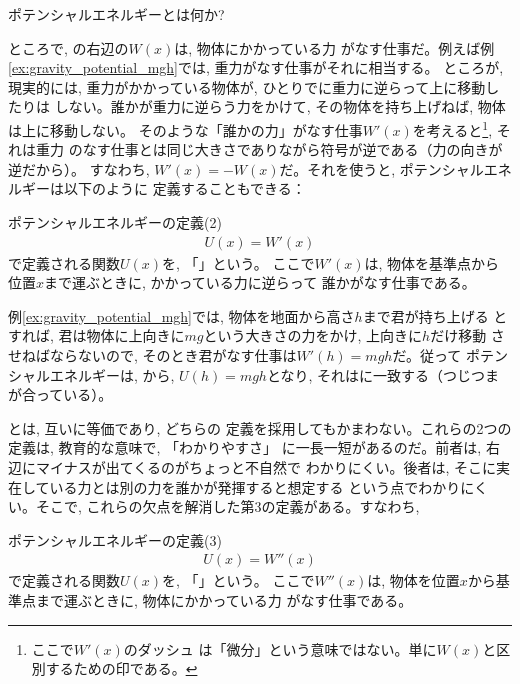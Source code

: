 %
\begin{q}\label{q:def_potential}
ポテンシャルエネルギーとは何か? 
\end{q}

ところで, の右辺の$W(x)$は, 物体にかかっている力
がなす仕事だ。例えば例\ref{ex:gravity_potential_mgh}では, 重力がなす仕事がそれに相当する。
ところが, 現実的には, 重力がかかっている物体が, ひとりでに重力に逆らって上に移動したりは
しない。誰かが重力に逆らう力をかけて, その物体を持ち上げねば, 物体は上に移動しない。
そのような「誰かの力」がなす仕事$W'(x)$を考えると\footnote{ここで$W'(x)$のダッシュ
は「微分」という意味ではない。単に$W(x)$と区別するための印である。}, それは重力
のなす仕事とは同じ大きさでありながら符号が逆である（力の向きが逆だから）。
すなわち, $W'(x)=-W(x)$だ。それを使うと, ポテンシャルエネルギーは以下のように
定義することもできる：

\begin{itembox}{ポテンシャルエネルギーの定義(2)}
\begin{eqnarray}
U(x)=W'(x)\label{eq:potential2}
\end{eqnarray}
で定義される関数$U(x)$を, 「」という。
ここで$W'(x)$は, 物体を基準点から位置$x$まで運ぶときに, かかっている力に逆らって
誰かがなす仕事である。
\end{itembox}

例\ref{ex:gravity_potential_mgh}では, 物体を地面から高さ$h$まで君が持ち上げる
とすれば, 君は物体に上向きに$mg$という大きさの力をかけ, 上向きに$h$だけ移動
させねばならないので, そのとき君がなす仕事は$W'(h)=mgh$だ。従って
ポテンシャルエネルギーは, から, $U(h)=mgh$となり, 
それはに一致する（つじつまが合っている）。

とは, 互いに等価であり, どちらの
定義を採用してもかまわない。これらの2つの定義は, 教育的な意味で, 「わかりやすさ」
に一長一短があるのだ。前者は, 右辺にマイナスが出てくるのがちょっと不自然で
わかりにくい。後者は, そこに実在している力とは別の力を誰かが発揮すると想定する
という点でわかりにくい。そこで, これらの欠点を解消した第3の定義がある。すなわち, 

\begin{itembox}{ポテンシャルエネルギーの定義(3)}
\begin{eqnarray}
U(x)=W''(x)\label{eq:potential3}
\end{eqnarray}
で定義される関数$U(x)$を, 「」という。
ここで$W''(x)$は, 物体を位置$x$から基準点まで運ぶときに, 物体にかかっている力
がなす仕事である。
\end{itembox}

